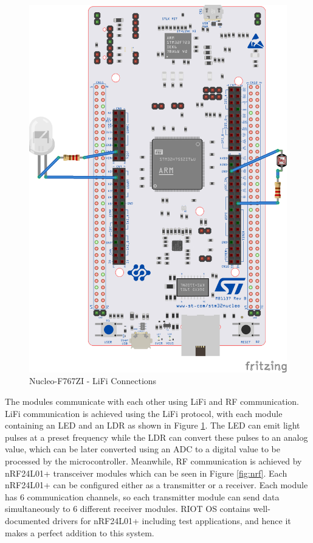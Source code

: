 \begin{figure}
    \centering
    \includegraphics[scale=0.7, angle=270]{images/LiFi.png}
    \caption{Nucleo-F767ZI - LiFi Connections}
    \label{fig:lifi}
\end{figure}

The modules communicate with each other using \acrshort{LiFi} and RF communication. \acrshort{LiFi} communication is achieved using the \acrshort{LiFi} protocol\cite{mukku2019integration}, with each module containing an LED and an LDR as shown in Figure \ref{fig:lifi}. The LED can emit light pulses at a preset frequency while the LDR can convert these pulses to an analog value, which can be later converted using an ADC to a digital value to be processed by the microcontroller.
Meanwhile, RF communication is achieved by nRF24L01+ transceiver modules which can be seen in Figure \ref{fig:nrf}. Each nRF24L01+ can be configured either as a transmitter or a receiver. Each module has 6 communication channels, so each transmitter module can send data simultaneously to 6 different receiver modules. RIOT OS contains well-documented drivers for nRF24L01+ including test applications, and hence it makes a perfect addition to this system.

